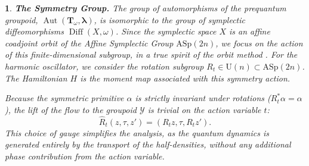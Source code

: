 \documentclass[11pt,reqno,letterpaper,twoside]{amsart}
\theoremstyle{articlestyle}
\newtheorem{article}{}
\theoremstyle{plain}
\theoremstyle{definition}
\def\artlabel[#1]{\textbf{#1.}}
\newcommand{\TT}{\mathbf{T}}
\newcommand{\cY}{{\mathcal Y}}
\newcommand{\blambda}{{\pmb{\lambda}}}
\DeclareMathOperator{\Diff}{Diff}
\DeclareMathOperator{\Aut}{Aut}
\newcommand{\0}{\hat{0}}
\newcommand{\1}{\hat{1}}
\begin{document}
  \begin{article}\artlabel[The Symmetry Group]
    The group of automorphisms of the prequantum groupoid,
    $\Aut(\TT_\omega, \blambda)$,
    is isomorphic to the group of symplectic diffeomorphisms $\Diff(X, \omega)$.
    Since the symplectic space $X$ is an affine coadjoint orbit of the Affine Symplectic Group $\mathrm{ASp}(2n)$,
    we focus on the action of this finite-dimensional subgroup,
    in a true spirit of the orbit method \cite{Kir62}.
    For the harmonic oscillator,
    we consider the rotation subgroup $R_t \in \mathrm{U}(n) \subset \mathrm{ASp}(2n)$.
    The Hamiltonian $H$ is the moment map associated with this symmetry action.
    
    Because the symmetric primitive $\alpha$ is strictly invariant under rotations ($R_t^* \alpha = \alpha$),
    the lift of the flow to the groupoid $\cY$ is trivial on the action variable $t$:
    $$
      \hat{R}_t(z, \tau, z') = (R_t z, \tau, R_t z').
      $$
    This choice of gauge simplifies the analysis,
    as the quantum dynamics is generated entirely by the transport of the half-densities,
    without any additional phase contribution from the action variable.
  \end{article}
  
\end{document}
